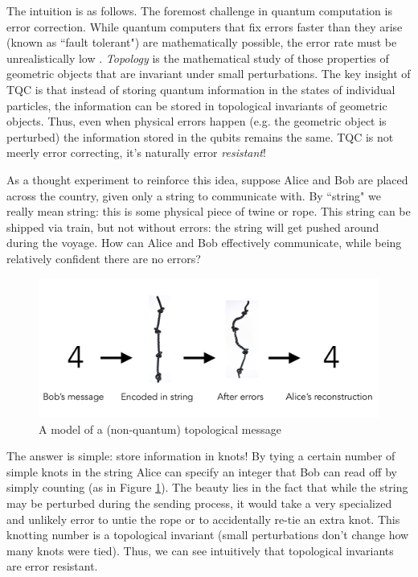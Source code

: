 \documentclass{article}
\theoremstyle{definition}
\numberwithin{figure}{section}
\begin{document}
The intuition is as follows. The foremost challenge in quantum computation is error correction. While quantum computers that fix errors faster than they arise (known as ``fault tolerant") are mathematically possible, the error rate must be unrealistically low \cite{gottesman1998theory}. \textit{Topology} is the mathematical study of those properties of geometric objects that are invariant under small perturbations. The key insight of TQC is that instead of storing quantum information in the states of individual particles, the information can be stored in topological invariants of geometric objects. Thus, even when physical errors happen (e.g. the geometric object is perturbed) the information stored in the qubits remains the same. TQC is not meerly error correcting, it's naturally error \textit{resistant}!

As a thought experiment to reinforce this idea, suppose Alice and Bob are placed across the country, given only a string to communicate with. By ``string" we really mean string: this is some physical piece of twine or rope. This string can be shipped via train, but not without errors: the string will get pushed around during the voyage. How can Alice and Bob effectively communicate, while being relatively confident there are no errors?

\begin{figure}
\begin{center}
\includegraphics[scale=0.25]{rope-deformations}
\caption{A model of a (non-quantum) topological message}
\label{fig:rope-deformations}
\end{center}
\end{figure}

The answer is simple: store information in knots! By tying a certain number of simple knots in the string Alice can specify an integer that Bob can read off by simply counting (as in Figure \ref{fig:rope-deformations}). The beauty lies in the fact that while the string may be perturbed during the sending process, it would take a very specialized and unlikely error to untie the rope or to accidentally re-tie an extra knot. This knotting number is a topological invariant (small perturbations don't change how many knots were tied). Thus, we can see intuitively that topological invariants are error resistant.
\end{document}
